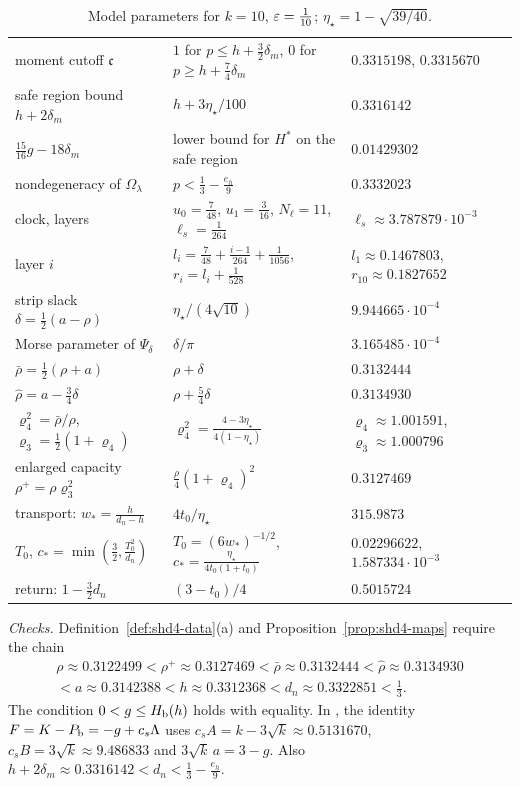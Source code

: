 \begin{table}[ht]
\begin{tabular}{@{}p{}p{}p{}@{}}
moment cutoff $\mathfrak c$ & $1$ for $p\le h+\frac32\delta_m$, $0$ for $p\ge h+\frac74\delta_m$ & $0.3315198$, $0.3315670$\\
safe region bound $h+2\delta_m$ & $h+3\eta_\star/100$ & $0.3316142$\\
$\frac{15}{16}g-18\delta_m$ & lower bound for $H^*$ on the safe region & $0.01429302$\\
nondegeneracy of $\Omega_\lambda$ & $p<\frac13-\frac{e_h}9$ & $0.3332023$\\
clock, layers & $u_0=\frac7{48}$, $u_1=\frac3{16}$, $N_\ell=11$, $\ell_s=\frac1{264}$ & $\ell_s\approx3.787879\cdot10^{-3}$\\
layer $i$ & $l_i=\frac7{48}+\frac{i-1}{264}+\frac1{1056}$, $r_i=l_i+\frac1{528}$ & $l_1\approx0.1467803$, $r_{10}\approx0.1827652$\\
\midrule
strip slack $\delta=\frac12(a-\rho)$ & $\eta_\star/(4\sqrt{10})$ & $9.944665\cdot10^{-4}$\\
Morse parameter of $\Psi_\delta$ & $\delta/\pi$ & $3.165485\cdot10^{-4}$\\
$\bar\rho=\frac12(\rho+a)$ & $\rho+\delta$ & $0.3132444$\\
$\hat\rho=a-\frac34\delta$ & $\rho+\frac54\delta$ & $0.3134930$\\
$\varrho_4^2=\bar\rho/\rho$, $\varrho_3=\frac12(1+\varrho_4)$ & $\varrho_4^2=\frac{4-3\eta_\star}{4(1-\eta_\star)}$ & $\varrho_4\approx1.001591$, $\varrho_3\approx1.000796$\\
enlarged capacity $\rho^+=\rho \varrho_3^2$ & $\frac\rho4(1+\varrho_4)^2$ & $0.3127469$\\
\midrule
transport: $w_*=\frac h{d_n-h}$ & $4t_0/\eta_\star$ & $315.9873$\\
$T_0$, $c_*=\min(\frac32,\frac{T_0^2}{d_n})$ & $T_0=(6w_*)^{-1/2}$, $c_*=\frac{\eta_\star}{4t_0(1+t_0)}$ & $0.02296622$, $1.587334\cdot10^{-3}$\\
return: $1-\frac32d_n$ & $(3-t_0)/4$ & $0.5015724$\\
\bottomrule
\end{tabular}
\caption{Model parameters for $k=10$, $\varepsilon=\frac1{10}$; $\eta_\star=1-\sqrt{39/40}$.}
\label{tab:example-model}
\end{table}

\emph{Checks.} Definition~\ref{def:shd4-data}(a) and Proposition~\ref{prop:shd4-maps} require the chain
\begin{multline*}
 \rho\approx0.3122499<\rho^+\approx0.3127469<\bar\rho\approx0.3132444<\hat\rho\approx0.3134930\\
 <a\approx0.3142388<h\approx0.3312368<d_n\approx0.3322851<\tfrac13 .
\end{multline*}
The condition $0<g\le H_{\mathrm b}(h)$ holds with equality. In , the identity $F=K-P_{\mathrm b}=-g+c_s\Lambda$ uses $c_sA=k-3\sqrt k\approx0.5131670$, $c_sB=3\sqrt k\approx9.486833$ and $3\sqrt k\,a=3-g$. Also $h+2\delta_m\approx0.3316142<d_n<\frac13-\frac{e_h}9$.


